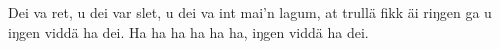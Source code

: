 Dei va ret, u dei var slet,
u dei va int mai’n lagum,
at trullä fikk äi riŋgen ga
u iŋgen viddä ha dei.
Ha ha ha ha ha ha,
iŋgen viddä ha dei.
